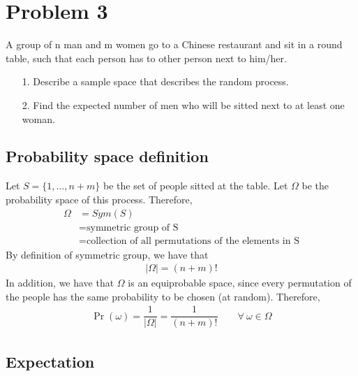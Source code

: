 
\section{Problem 3}

A group of n man and m women go to a Chinese restaurant and sit in a round table,
such that each person has to other person next to him/her.
\begin{itemize}
	\item[1.] Describe a sample space that describes the random process.
	\item[2.] Find the expected number of men who will be sitted next to at least one woman.
\end{itemize} 


\subsection{Probability space definition}

Let $S = \{1, \ldots, n+m\}$ be the set of people sitted at the table. Let $\Omega$ be the probability space of this process. Therefore,
\begin{align*}
	\Omega &= Sym(S)\\
	&= \text{symmetric group of S}\\
	&= \text{collection of all permutations of the elements in S}
\end{align*}
By definition of symmetric group\cite{sym_group}, we have that
\begin{align*}
	|\Omega| = (n+m)!
\end{align*}
In addition, we have that $\Omega$ is an equiprobable space, since every permutation of the people has the same probability to be chosen (at random). Therefore,
\begin{align*}
	\Pr(\omega) = \dfrac{1}{|\Omega|} = \dfrac{1}{(n+m)!} \qquad \forall \ \omega\in\Omega
\end{align*}


\subsection{Expectation}

